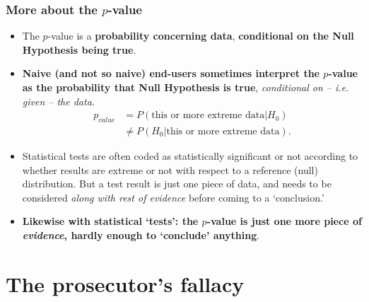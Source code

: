 \documentclass[10pt]{beamer}\usepackage[]{graphicx}\usepackage[]{color}
\begin{document}
\begin{frame}
	\frametitle{More about the $p$-value}
	
	\begin{itemize}
		\setlength\itemsep{.3em}
		\item The $p$-value is a \textbf{probability concerning data}, \textbf{conditional on the Null Hypothesis being true}. \pause
		\item \textbf{Naive (and not so naive) end-users sometimes interpret the $p$-value  as
			the probability that Null Hypothesis is true}, \textit{conditional on -- i.e. given --  the data.} \pause
		\begin{align*}
		p_{value} & = P(\textrm{this or more extreme data}| H_0) \\
		& \neq P(H_0|\textrm{this or more extreme data}).
		\end{align*}
		\item Statistical tests are often coded as statistically significant or not according to whether results are extreme or not with respect to a reference (null)  distribution.  But a test result  is just one piece of data, and needs to be considered \textit{along with  rest of evidence} before coming to a `conclusion.' \item \textbf{Likewise with statistical `tests': the $p$-value is just one more piece of \textit{evidence}, hardly enough to `conclude' anything}. 
	\end{itemize}
\end{frame}

\section{The prosecutor's fallacy}
\end{document}
